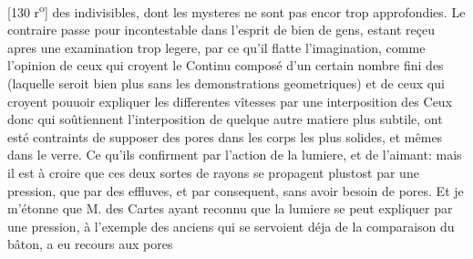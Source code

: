 [130 r\textsuperscript{o}] des indivisibles, dont les mysteres ne sont pas encor trop approfondies. Le contraire passe pour incontestable dans l'esprit de bien de gens, estant re\c{c}eu apres une examination trop legere, par ce qu'il flatte l'imagination, comme l'opinion de ceux qui croyent le Continu  compos\'{e} d'un certain nombre fini des  (laquelle seroit bien plus  sans les demonstrations geometriques) et de ceux qui croyent pouuoir expliquer les differentes vîtesses\protect{} par une interposition des \pend \pstart  Ceux donc qui soûtiennent l'interposition de quelque autre matiere plus subtile,  ont est\'{e} contraints de supposer des pores dans les corps\protect{} les plus solides, et mêmes dans le verre. Ce qu'ils confirment par l'action de la lumiere, et de l'aimant: mais il est \`{a} croire que ces deux sortes de rayons se propagent plustost par une pression, que par des effluves, et par consequent, sans avoir besoin de pores. Et je m'\'{e}tonne que M. des Cartes\protect{} ayant reconnu que la lumiere se peut expliquer par une pression, \`{a} l'exemple des anciens qui se servoient d\'{e}ja de la comparaison du bâton, a eu recours aux pores
